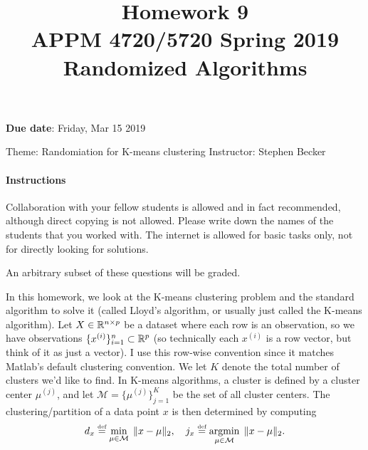 \documentclass[10pt, letterpaper]{scrartcl}
\title{Homework 9 \solTitle{Selected Solutions} \\APPM 4720/5720 Spring 2019 \\ Randomized Algorithms}
\date{}
\newenvironment{instructions}{}{}
\begin{document}
\maketitle
\vspace{-6em}
\textbf{Due date}: Friday, Mar 15 2019

Theme: Randomiation for K-means clustering   \hfill Instructor: Stephen Becker %

\begin{instructions}
\paragraph{Instructions}
Collaboration with your fellow students is allowed and in fact recommended, although direct copying is not allowed.  Please write down the names of the students that you worked with. The internet is allowed for basic tasks only, not for directly looking for solutions.

An arbitrary subset of these questions will be graded.

%
%
\end{instructions}


\renewcommand{\xi}{x^{(i)}}
\newcommand{\xj}{x^{(j)}}
\newcommand{\muj}{\mu^{(j)}}
\newcommand{\M}{\mathcal{M}}
\vspace{2ex}
In this homework, we look at the K-means clustering problem and the standard algorithm to solve it (called Lloyd's algorithm, or usually just called the K-means algorithm).
Let $X \in \mathbb{R}^{n \times p}$ be a dataset where each row is an observation, so we have observations $\{ \xi \}_{i=1}^n \subset \R^p$ (so technically each $\xi$ is a  row vector,
but think of it as just a vector). I use this row-wise convention since it matches Matlab's default clustering convention. We let $K$ denote the total number of clusters we'd like to find. In K-means algorithms, a cluster is defined by a cluster center $\muj$, and let $\M = \{\muj\}_{j=1}^K$ be the set of all cluster centers. The clustering/partition of a data point $x$ is then determined by computing
\begin{equation}\label{eq:assignment}
d_x \defeq \min_{ \mu \in\M } \; \|x-\mu\|_2, \quad
j_x \defeq \argmin_{ \mu \in\M } \; \|x-\mu\|_2.
\end{equation}
\end{document}
